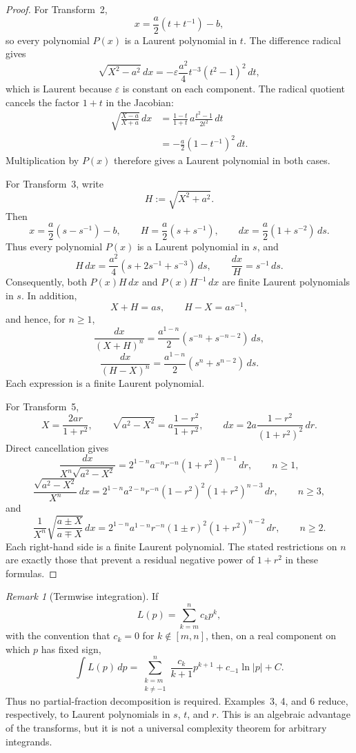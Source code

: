 \documentclass[11pt]{article}
\theoremstyle{remark}
\newtheorem*{remark}{Remark}
\begin{document}
\begin{proof}
For Transform~2,
\[
x=\frac{a}{2}\left(t+t^{-1}\right)-b,
\]
so every polynomial $P(x)$ is a Laurent polynomial in $t$. The difference radical gives
\[
\sqrt{X^2-a^2}\,dx
=-\varepsilon\frac{a^2}{4}t^{-3}(t^2-1)^2\,dt,
\]
which is Laurent because $\varepsilon$ is constant on each component. The radical quotient cancels the factor $1+t$ in the Jacobian:
\begin{align*}
\sqrt{\frac{X-a}{X+a}}\,dx
&=\frac{1-t}{1+t}\,a\frac{t^2-1}{2t^2}\,dt\\
&=-\frac{a}{2}\left(1-t^{-1}\right)^2\,dt.
\end{align*}
Multiplication by $P(x)$ therefore gives a Laurent polynomial in both cases.

For Transform~3, write
\[
H:=\sqrt{X^2+a^2}.
\]
Then
\[
x=\frac{a}{2}\left(s-s^{-1}\right)-b,
\qquad
H=\frac{a}{2}\left(s+s^{-1}\right),
\qquad
dx=\frac{a}{2}\left(1+s^{-2}\right)\,ds.
\]
Thus every polynomial $P(x)$ is a Laurent polynomial in $s$, and
\[
H\,dx=\frac{a^2}{4}\left(s+2s^{-1}+s^{-3}\right)\,ds,
\qquad
\frac{dx}{H}=s^{-1}\,ds.
\]
Consequently, both $P(x)H\,dx$ and $P(x)H^{-1}\,dx$ are finite Laurent polynomials in $s$. In addition,
\[
X+H=as,
\qquad
H-X=as^{-1},
\]
and hence, for $n\ge1$,
\[
\frac{dx}{(X+H)^n}
=\frac{a^{1-n}}{2}\left(s^{-n}+s^{-n-2}\right)\,ds,
\]
\[
\frac{dx}{(H-X)^n}
=\frac{a^{1-n}}{2}\left(s^n+s^{n-2}\right)\,ds.
\]
Each expression is a finite Laurent polynomial.

For Transform~5,
\[
X=\frac{2ar}{1+r^2},
\qquad
\sqrt{a^2-X^2}=a\frac{1-r^2}{1+r^2},
\qquad
dx=2a\frac{1-r^2}{(1+r^2)^2}\,dr.
\]
Direct cancellation gives
\[
\frac{dx}{X^n\sqrt{a^2-X^2}}
=2^{1-n}a^{-n}r^{-n}(1+r^2)^{n-1}\,dr,
\qquad n\ge1,
\]
\[
\frac{\sqrt{a^2-X^2}}{X^n}\,dx
=2^{1-n}a^{2-n}r^{-n}(1-r^2)^2(1+r^2)^{n-3}\,dr,
\qquad n\ge3,
\]
and
\[
\frac{1}{X^n}\sqrt{\frac{a\pm X}{a\mp X}}\,dx
=2^{1-n}a^{1-n}r^{-n}(1\pm r)^2(1+r^2)^{n-2}\,dr,
\qquad n\ge2.
\]
Each right-hand side is a finite Laurent polynomial. The stated restrictions on $n$ are exactly those that prevent a residual negative power of $1+r^2$ in these formulas.
\end{proof}

\begin{remark}[Termwise integration]
If
\[
L(p)=\sum_{k=m}^{n}c_kp^k,
\]
with the convention that \(c_k=0\) for \(k\notin[m,n]\),
then, on a real component on which $p$ has fixed sign,
\[
\int L(p)\,dp
=
\sum_{\substack{k=m\\k\ne-1}}^{n}\frac{c_k}{k+1}p^{k+1}
+c_{-1}\ln|p|+C.
\]
Thus no partial-fraction decomposition is required. Examples~3, 4, and 6 reduce, respectively, to Laurent polynomials in $s$, $t$, and $r$. This is an algebraic advantage of the transforms, but it is not a universal complexity theorem for arbitrary integrands.
\end{remark}
\end{document}
